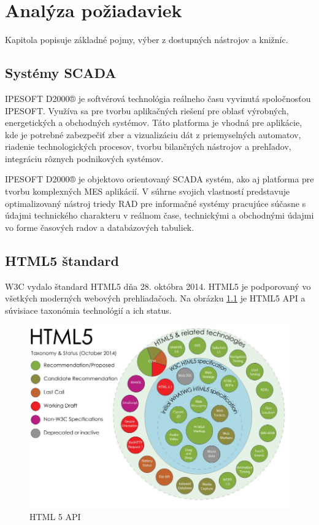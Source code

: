 \chapter{Analýza požiadaviek}
Kapitola popisuje základné pojmy, výber z dostupných nástrojov a knižníc. 

\section{Systémy \acs{SCADA} }
IPESOFT D2000® je softvérová technológia reálneho času vyvinutá spoločnosťou IPESOFT. Využíva sa pre tvorbu aplikačných riešení pre oblasť výrobných, energetických a obchodných systémov. Táto platforma je vhodná pre aplikácie, kde je potrebné zabezpečiť zber a vizualizáciu dát z priemyselných automatov, riadenie technologických procesov, tvorbu bilančných nástrojov a prehľadov, integráciu rôznych podnikových systémov.\cite{ipesoft}

IPESOFT D2000® je objektovo orientovaný \ac{SCADA} systém, ako aj platforma pre tvorbu komplexných \ac{MES} aplikácií. V súhrne svojich vlastností predstavuje optimalizovaný nástroj triedy \ac{RAD} pre informačné systémy pracujúce súčasne s údajmi technického charakteru v reálnom čase, technickými a obchodnými údajmi vo forme časových radov a  databázových tabuliek. \cite{ipesoft}

\section{\acs{HTML}5 štandard}

\ac{W3C} vydalo štandard \acs{HTML}5 dňa 28. októbra 2014. 
HTML5 je podporovaný vo všetkých moderných webových prehliadačoch. 
Na obrázku \ref{fig:obrazokHTML} \cite{sergey} je HTML5 \acs{API} a súvisiace taxonómia technológií a ich status. 

\begin{center}
	\begin{figure}[H]
\centering
\includegraphics[width=0.7\linewidth]{obrazky/obrazokHTML}
\caption{HTML 5 API}
\label{fig:obrazokHTML}
\end{figure}
\end{center}

